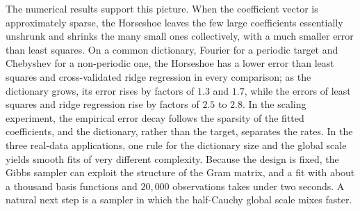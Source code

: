 The numerical results support this picture. When the coefficient vector is approximately sparse, the Horseshoe leaves the few large coefficients essentially unshrunk and shrinks the many small ones collectively, with a much smaller error than least squares. On a common dictionary, Fourier for a periodic target and Chebyshev for a non-periodic one, the Horseshoe has a lower error than least squares and cross-validated ridge regression in every comparison; as the dictionary grows, its error rises by factors of $1.3$ and $1.7$, while the errors of least squares and ridge regression rise by factors of $2.5$ to $2.8$. In the scaling experiment, the empirical error decay follows the sparsity of the fitted coefficients, and the dictionary, rather than the target, separates the rates. In the three real-data applications, one rule for the dictionary size and the global scale yields smooth fits of very different complexity. Because the design is fixed, the Gibbs sampler can exploit the structure of the Gram matrix, and a fit with about a thousand basis functions and $20{,}000$ observations takes under two seconds. A natural next step is a sampler in which the half-Cauchy global scale mixes faster.
